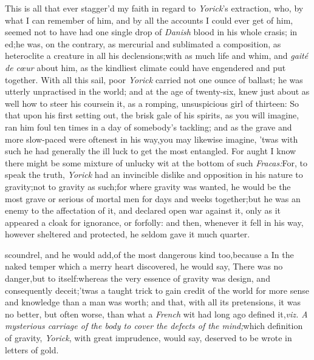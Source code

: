 \documentclass{article}
\begin{document}
This is all that ever stagger’d my faith in regard to
\textit{Yorick}’s extraction, who, by what I can remember of
him, and by all\pb 
the accounts I could ever get of him,\break
seemed not to have had one single drop\break
of \textit{Danish} blood in his whole crasis; in\break
{}
ed;\tsk  he was, on the contrary, as mercurial and
sublimated a composition,\tsk\break
as heteroclite a creature in all
his declensions;\tsk  with as much life and whim, and
\textit{gaité de cœur} about him, as the kindliest
climate could have engendered and put together. With all this sail,
poor \textit{Yorick} carried not one ounce of ballast; he was utterly
unpractised in the world; and at the age of twenty-six, knew just
about as well how to steer his course\pb in it, as a romping,
unsuspicious girl of thirteen: So that upon his first setting out,
the brisk gale of his spirits, as you will imagine, ran him foul
ten times in a day of somebody’s tackling; and as the grave
and more slow-paced were oftenest in his way,\tsh  you may
likewise imagine, ’twas with such he had generally the ill
luck to get the most entangled. For aught I know there might be
some mixture of unlucky wit at the bottom of such
\textit{Fracas:}\tsh  For, to speak the truth, \textit{Yorick}
had an invincible dislike and opposition in his nature to
gravity;\tsk  not to gravity as such;\tsk  for where gravity was
wanted, he would be the most grave or serious of mortal men for
days and weeks together;\tsk  but he was an enemy to the
affectation of it, and declared open war against it, only as it
appeared a cloak for ignorance, or for\pb folly: and then, whenever it
fell in his way, however sheltered and protected, he seldom gave it
much quarter.

\noindent
{}
scoundrel, and he would add,\tsk  of the
most dangerous kind too,\tsk  because a\break
{} 
In the naked temper which a merry heart discovered, he would say, There was no
danger,\tsk  but to itself:\tsk  whereas the very essence of gravity was design, and
consequently deceit;\tsk  ’twas a taught trick to gain credit of the world for more
sense and knowledge than a man was worth; and that, with all its pretensions,\tsk
it was no better, but often worse, than what a \textit{French} wit had long ago
defined it,\tsk  \textit{viz. A mysterious carriage of the body to cover the defects
of the mind;}\tsk  which definition of gravity, \textit{Yorick}, with great
imprudence, would say, deserved to be wrote in letters of gold.
\end{document}

